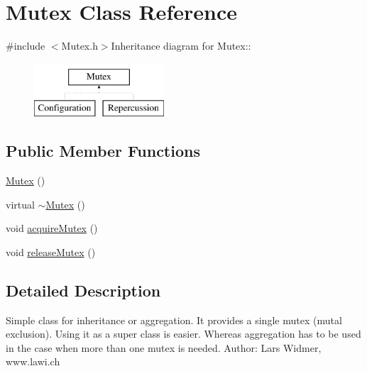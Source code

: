 \hypertarget{classMutex}{
\section{Mutex Class Reference}
\label{classMutex}
}


{\ttfamily \#include $<$Mutex.h$>$}Inheritance diagram for Mutex::\begin{figure}[H]
\begin{center}
\leavevmode
\includegraphics[height=2cm]{classMutex}
\end{center}
\end{figure}
\subsection*{Public Member Functions}
\begin{DoxyCompactItemize}
\item 
\hyperlink{classMutex_a593423d868daf926c7b0d63a833ae29a}{Mutex} ()
\item 
virtual \hyperlink{classMutex_ac9e9182407f5f74892318607888e9be4}{$\sim$Mutex} ()
\item 
void \hyperlink{classMutex_a0f7dda8ab1e2ad808feacb3c9d7fc8ad}{acquireMutex} ()
\item 
void \hyperlink{classMutex_a2f4a3dd7d969f9d77e67ceea9cb6bc3a}{releaseMutex} ()
\end{DoxyCompactItemize}


\subsection{Detailed Description}
Simple class for inheritance or aggregation. It provides a single mutex (mutal exclusion). Using it as a super class is easier. Whereas aggregation has to be used in the case when more than one mutex is needed. Author: Lars Widmer, www.lawi.ch 

